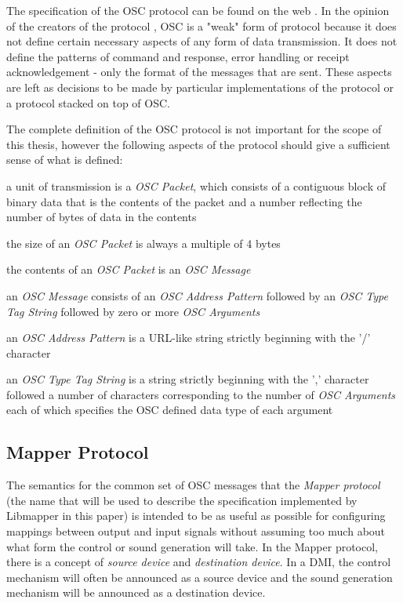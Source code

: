 The specification of the OSC protocol can be found on the web \cite{osc2011}. In the opinion of the creators of the protocol \cite{osc2009}, OSC is a "weak" form of protocol because it does not define certain necessary aspects of any form of data transmission. It does not define the patterns of command and response, error handling or receipt acknowledgement - only the format of the messages that are sent. These aspects are left as decisions to be made by particular implementations of the protocol or a protocol stacked on top of OSC.

The complete definition of the OSC protocol is not important for the scope of this thesis, however the following aspects of the protocol should give a sufficient sense of what is defined:

\begin{description}
\item a unit of transmission is a \emph{OSC Packet}, which consists of a contiguous block of binary data that is the contents of the packet and a number reflecting the number of bytes of data in the contents
\item the size of an \emph{OSC Packet} is always a multiple of 4 bytes
\item the contents of an \emph{OSC Packet} is an \emph{OSC Message}
\item an \emph{OSC Message} consists of an \emph{OSC Address Pattern} followed by an \emph{OSC Type Tag String} followed by zero or more \emph{OSC Arguments}
\item an \emph{OSC Address Pattern} is a URL-like string strictly beginning with the '/' character
\item an \emph{OSC Type Tag String} is a string strictly beginning with the ',' character followed a number of characters corresponding to the number of \emph{OSC Arguments} each of which specifies the OSC defined data type of each argument
\end{description}

\subsection{Mapper Protocol}

The semantics for the common set of OSC messages that the \emph{Mapper protocol} (the name that will be used to describe the specification implemented by Libmapper in this paper) is intended to be as useful as possible for configuring mappings between output and input signals without assuming too much about what form the control or sound generation will take. In the Mapper protocol, there is a concept of \emph{source device} and \emph{destination device}. In a DMI, the control mechanism will often be announced as a source device and the sound generation mechanism will be announced as a destination device. 

